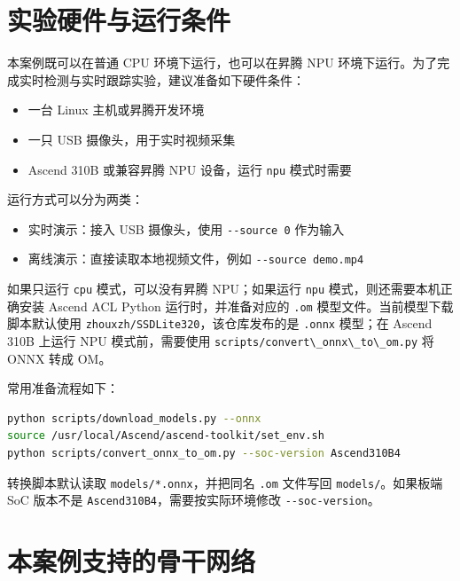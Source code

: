 \section{实验硬件与运行条件}\label{src-experiment-case2-h2}

本案例既可以在普通 CPU 环境下运行，也可以在昇腾 NPU
环境下运行。为了完成实时检测与实时跟踪实验，建议准备如下硬件条件：

\begin{itemize}
\tightlist
\item
  一台 Linux 主机或昇腾开发环境
\item
  一只 USB 摄像头，用于实时视频采集
\item
  Ascend 310B 或兼容昇腾 NPU 设备，运行 \passthrough{\lstinline!npu!}
  模式时需要
\end{itemize}

运行方式可以分为两类：

\begin{itemize}
\tightlist
\item
  实时演示：接入 USB 摄像头，使用 \passthrough{\lstinline!--source 0!}
  作为输入
\item
  离线演示：直接读取本地视频文件，例如
  \passthrough{\lstinline!--source demo.mp4!}
\end{itemize}

如果只运行 \passthrough{\lstinline!cpu!} 模式，可以没有昇腾
NPU；如果运行 \passthrough{\lstinline!npu!} 模式，则还需要本机正确安装
Ascend ACL Python 运行时，并准备对应的 \passthrough{\lstinline!.om!}
模型文件。当前模型下载脚本默认使用
\passthrough{\lstinline!zhouxzh/SSDLite320!}，该仓库发布的是
\passthrough{\lstinline!.onnx!} 模型；在 Ascend 310B 上运行 NPU
模式前，需要使用
\passthrough{\lstinline!scripts/convert\_onnx\_to\_om.py!} 将 ONNX 转成
OM。

常用准备流程如下：

\begin{lstlisting}[language=bash]
python scripts/download_models.py --onnx
source /usr/local/Ascend/ascend-toolkit/set_env.sh
python scripts/convert_onnx_to_om.py --soc-version Ascend310B4
\end{lstlisting}

转换脚本默认读取 \passthrough{\lstinline!models/*.onnx!}，并把同名
\passthrough{\lstinline!.om!} 文件写回
\passthrough{\lstinline!models/!}。如果板端 SoC 版本不是
\passthrough{\lstinline!Ascend310B4!}，需要按实际环境修改
\passthrough{\lstinline!--soc-version!}。

\section{本案例支持的骨干网络}\label{src-experiment-case2-h3}

